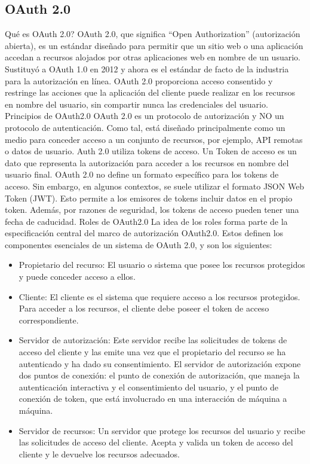 \documentclass[12pt]{article}
\begin{document}
\subsection*{OAuth 2.0}
Qué es OAuth 2.0?
OAuth 2.0, que significa “Open Authorization” (autorización abierta), es un estándar diseñado para permitir que un sitio web o una aplicación accedan a recursos alojados por otras aplicaciones web en nombre de un usuario. Sustituyó a OAuth 1.0 en 2012 y ahora es el estándar de facto de la industria para la autorización en línea. OAuth 2.0 proporciona acceso consentido y restringe las acciones que la aplicación del cliente puede realizar en los recursos en nombre del usuario, sin compartir nunca las credenciales del usuario.
Principios de OAuth2.0
OAuth 2.0 es un protocolo de autorización y NO un protocolo de autenticación. Como tal, está diseñado principalmente como un medio para conceder acceso a un conjunto de recursos, por ejemplo, API remotas o datos de usuario.
Auth 2.0 utiliza tokens de acceso. Un Token de acceso es un dato que representa la autorización para acceder a los recursos en nombre del usuario final. OAuth 2.0 no define un formato específico para los tokens de acceso. Sin embargo, en algunos contextos, se suele utilizar el formato JSON Web Token (JWT). Esto permite a los emisores de tokens incluir datos en el propio token. Además, por razones de seguridad, los tokens de acceso pueden tener una fecha de caducidad.
Roles de OAuth2.0
La idea de los roles forma parte de la especificación central del marco de autorización OAuth2.0. Estos definen los componentes esenciales de un sistema de OAuth 2.0, y son los siguientes:
\begin{itemize}
\item Propietario del recurso: El usuario o sistema que posee los recursos protegidos y puede conceder acceso a ellos.
\item Cliente: El cliente es el sistema que requiere acceso a los recursos protegidos. Para acceder a los recursos, el cliente debe poseer el token de acceso correspondiente.
\item Servidor de autorización: Este servidor recibe las solicitudes de tokens de acceso del cliente y las emite una vez que el propietario del recurso se ha autenticado y ha dado su consentimiento. El servidor de autorización expone dos puntos de conexión: el punto de conexión de autorización, que maneja la autenticación interactiva y el consentimiento del usuario, y el punto de conexión de token, que está involucrado en una interacción de máquina a máquina.
\item Servidor de recursos: Un servidor que protege los recursos del usuario y recibe las solicitudes de acceso del cliente. Acepta y valida un token de acceso del cliente y le devuelve los recursos adecuados.
\end{itemize}
\end{document}
